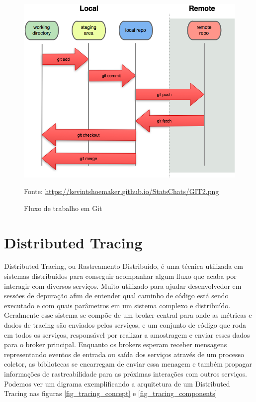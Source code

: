 \documentclass[twosideprint]{politex}
\newcommand{\legend}[1]{\begin{center}\def\caption{}\caption{#1}\end{center}}
\begin{document}
	\begin{figure}[htb]
		\caption{\label{fig_git2}Fluxo de trabalho em Git}
		\begin{center}
		\includegraphics[scale=1]{pictures/GIT2.png}
		\end{center}
		\legend{Fonte: \url{https://kevintshoemaker.github.io/StatsChats/GIT2.png}}
	\end{figure}

	
	\section{Distributed Tracing}
	
	Distributed Tracing, ou Rastreamento Distribuído, é uma técnica utilizada em sistemas distribuídos para conseguir acompanhar algum fluxo que acaba por interagir com diversos serviços. Muito utilizado para ajudar desenvolvedor em sessões de depuração afim de entender qual caminho de código está sendo executado e com quais parâmetros em um sistema complexo e distribuído. Geralmente esse sistema se compõe de um broker central para onde as métricas e dados de tracing são enviados pelos serviços, e um conjunto de código que roda em todos os serviços, responsável por realizar a amostragem e enviar esses dados para o broker principal. Enquanto os brokers esperam receber mensagens representando eventos de entrada ou saída dos serviços através de um processo coletor, as bibliotecas se encarregam de enviar essa menagem e também propagar informações de rastreabilidade para as próximas interações com outros serviços. Podemos ver um digrama exemplificando a arquitetura de um Distributed Tracing nas figuras \ref{fig_tracing_concept} e \ref{fig_tracing_components}
	
\end{document}
